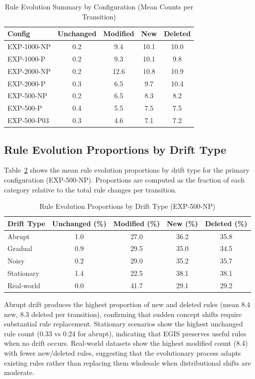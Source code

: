 \documentclass[lettersize,10pt]{article}
\begin{document}
\begin{table}[htbp]
\centering
\caption{Rule Evolution Summary by Configuration (Mean Counts per Transition)}
\label{tab:s_rule_evo}
\footnotesize
\begin{tabular}{lcccc}
\toprule
\textbf{Config} & \textbf{Unchanged} & \textbf{Modified} & \textbf{New} & \textbf{Deleted} \\
\midrule
EXP-1000-NP & 0.2 & 9.4 & 10.1 & 10.0 \\
EXP-1000-P & 0.2 & 9.3 & 10.1 & 9.8 \\
EXP-2000-NP & 0.2 & 12.6 & 10.8 & 10.9 \\
EXP-2000-P & 0.3 & 6.5 & 9.7 & 10.4 \\
EXP-500-NP & 0.2 & 6.5 & 8.3 & 8.2 \\
EXP-500-P & 0.4 & 5.5 & 7.5 & 7.5 \\
EXP-500-P03 & 0.3 & 4.6 & 7.1 & 7.2 \\
\bottomrule
\end{tabular}
\end{table}

\subsection{Rule Evolution Proportions by Drift Type}
\label{sec:s7_drift_type}
Table~\ref{tab:s_rule_evo_drift} shows the mean rule evolution proportions by drift type for the primary configuration (EXP-500-NP). Proportions are computed as the fraction of each category relative to the total rule changes per transition.

\begin{table}[htbp]
\centering
\caption{Rule Evolution Proportions by Drift Type (EXP-500-NP)}
\label{tab:s_rule_evo_drift}
\footnotesize
\begin{tabular}{lcccc}
\toprule
\textbf{Drift Type} & \textbf{Unchanged (\%)} & \textbf{Modified (\%)} & \textbf{New (\%)} & \textbf{Deleted (\%)} \\
\midrule
Abrupt & 1.0 & 27.0 & 36.2 & 35.8 \\
Gradual & 0.9 & 29.5 & 35.0 & 34.5 \\
Noisy & 0.2 & 29.0 & 35.2 & 35.7 \\
Stationary & 1.4 & 22.5 & 38.1 & 38.1 \\
Real-world & 0.0 & 41.7 & 29.1 & 29.2 \\
\bottomrule
\end{tabular}
\end{table}

Abrupt drift produces the highest proportion of new and deleted rules (mean 8.4 new, 8.3 deleted per transition), confirming that sudden concept shifts require substantial rule replacement. Stationary scenarios show the highest unchanged rule count (0.33 vs 0.24 for abrupt), indicating that EGIS preserves useful rules when no drift occurs. Real-world datasets show the highest modified count (8.4) with fewer new/deleted rules, suggesting that the evolutionary process adapts existing rules rather than replacing them wholesale when distributional shifts are moderate.
\end{document}
